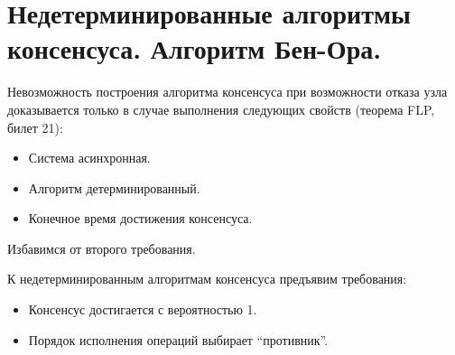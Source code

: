 \section{Недетерминированные алгоритмы консенсуса. Алгоритм Бен-Ора.}

\begin{remark}
    Невозможность построения алгоритма консенсуса при возможности отказа узла доказывается
    только в случае выполнения следующих свойств (теорема FLP, билет 21):
    \begin{itemize}
        \item Система асинхронная.
        \item Алгоритм детерминированный.
        \item Конечное время достижения консенсуса.
    \end{itemize}
    Избавимся от второго требования.
\end{remark}

\begin{remark}
    К недетерминированным алгоритмам консенсуса предъявим требования:
    \begin{itemize}
        \item Консенсус достигается с вероятностью 1.
        \item Порядок исполнения операций выбирает ``противник''.
    \end{itemize}
\end{remark}

